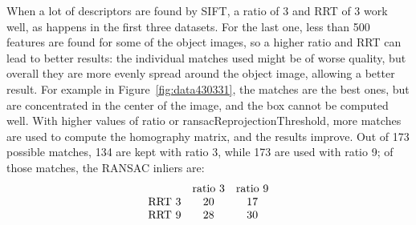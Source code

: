 \documentclass[a4paper]{article}
\newcommand{\rfig}[1]{Figure~\ref{#1}}
\begin{document}
When a lot of descriptors are found by SIFT, a ratio of 3 and RRT of 3 work well, as happens in the first three datasets. For the last one, less than 500 features are found for some of the object images, so a higher ratio and RRT can lead to better results: the individual matches used might be of worse quality, but overall they are more evenly spread around the object image, allowing a better result.
For example in \rfig{fig:data430331}, the matches are the best ones, but are concentrated in the center of the image, and the box cannot be computed well.
With higher values of ratio or ransacReprojectionThreshold, more matches are used to compute the homography matrix, and the results improve.
Out of 173 possible matches, 134 are kept with ratio 3, while 173 are used with ratio 9; of those matches, the RANSAC inliers are:
\begin{equation*}
    \begin{array}[h]{ccc}
         & \text{ratio 3} & \text{ratio 9} \\
        \text{RRT 3} & 20 & 17 \\
        \text{RRT 9} & 28 & 30 \\
    \end{array}
\end{equation*}
\end{document}
